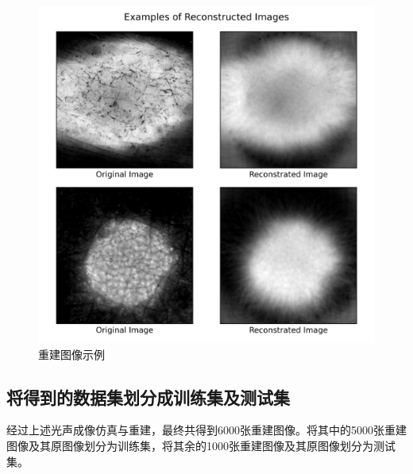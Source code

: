 \begin{figure}[h]
	\centering
	\includegraphics[width=0.75\columnwidth]{image/chap04/img405.png}
	\caption{重建图像示例}
	\label{img405}
\end{figure}

\subsection{将得到的数据集划分成训练集及测试集}
经过上述光声成像仿真与重建，最终共得到6000张重建图像。将其中的5000张重建图像及其原图像划分为训练集，将其余的1000张重建图像及其原图像划分为测试集。